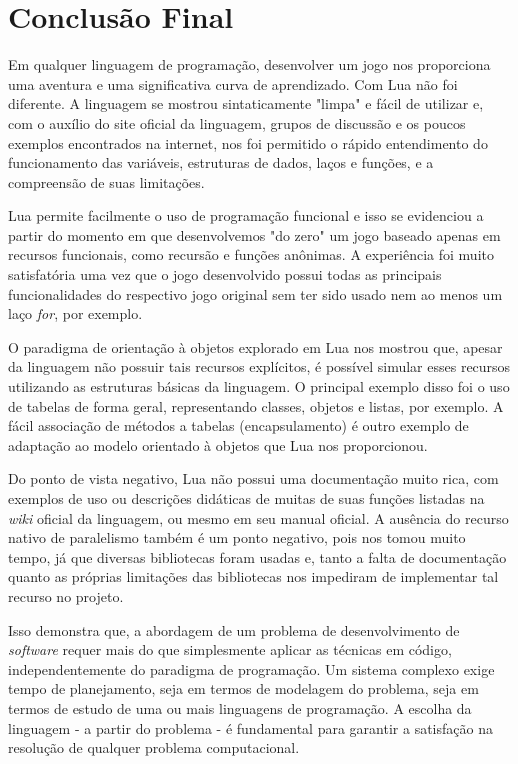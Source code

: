 \documentclass[rel_mlp]{iiufrgs}
\begin{document}
\chapter{Conclusão Final}

Em qualquer linguagem de programação, desenvolver um jogo nos proporciona uma aventura e uma significativa curva de aprendizado. Com Lua não foi diferente. A linguagem se mostrou sintaticamente "limpa" e fácil de utilizar e, com o auxílio do site oficial da linguagem, grupos de discussão e os poucos exemplos encontrados na internet, nos foi permitido o rápido entendimento do funcionamento das variáveis, estruturas de dados, laços e funções, e a compreensão de suas limitações.

Lua permite facilmente o uso de programação funcional e isso se evidenciou a partir do momento em que desenvolvemos "do zero" um jogo baseado apenas em recursos funcionais, como recursão e funções anônimas. A experiência foi muito satisfatória uma vez que o jogo desenvolvido possui todas as principais funcionalidades do respectivo jogo original sem ter sido usado nem ao menos um laço \textit{for}, por exemplo. 

O paradigma de orientação à objetos explorado em Lua nos mostrou que, apesar da linguagem não possuir tais recursos explícitos, é possível simular esses recursos utilizando as estruturas básicas da linguagem. O principal exemplo disso foi o uso de tabelas de forma geral, representando classes, objetos e listas, por exemplo. A fácil associação de métodos a tabelas (encapsulamento) é outro exemplo de adaptação ao modelo orientado à objetos que Lua nos proporcionou.

Do ponto de vista negativo, Lua não possui uma documentação muito rica, com exemplos de uso ou descrições didáticas de muitas de suas funções listadas na \textit{wiki} oficial da linguagem, ou mesmo em seu manual oficial. A ausência do recurso nativo de paralelismo também é um ponto negativo, pois nos tomou muito tempo, já que diversas bibliotecas foram usadas e, tanto a falta de documentação quanto as próprias limitações das bibliotecas nos impediram de implementar tal recurso no projeto.

Isso demonstra que, a abordagem de um problema de desenvolvimento de \textit{software} requer mais do que simplesmente aplicar as técnicas em código, independentemente do paradigma de programação. Um sistema complexo exige tempo de planejamento, seja em termos de modelagem do problema, seja em termos de estudo de uma ou mais linguagens de programação. A escolha da linguagem - a partir do problema - é fundamental para garantir a satisfação na resolução de qualquer problema computacional.
\end{document}
